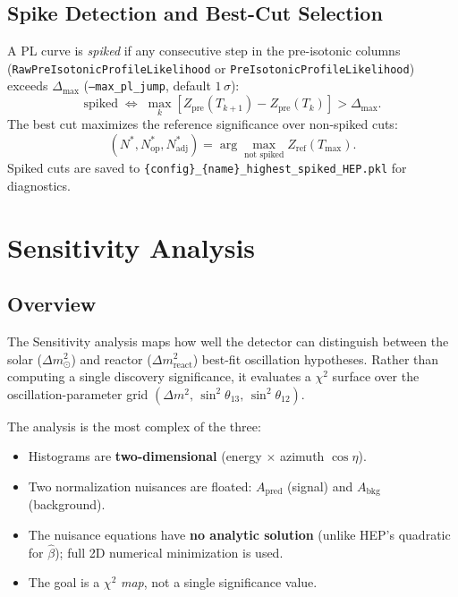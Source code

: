 \documentclass[12pt,a4paper]{article}
\newcommand{\bhat}{\hat{\beta}}
\newcommand{\Apred}{A_{\mathrm{pred}}}
\newcommand{\Abkg}{A_{\mathrm{bkg}}}
\begin{document}
\subsection{Spike Detection and Best-Cut Selection}
\label{sec:spike}

A PL curve is \emph{spiked} if any consecutive step in the pre-isotonic columns
(\texttt{RawPreIsotonicProfileLikelihood} or \texttt{PreIsotonicProfileLikelihood})
exceeds $\Delta_{\max}$ (\texttt{--max\_pl\_jump}, default $1\,\sigma$):
\begin{equation}
  \text{spiked} \;\Leftrightarrow\;
  \max_k\!\left[Z_{\mathrm{pre}}(T_{k+1})-Z_{\mathrm{pre}}(T_k)\right]>\Delta_{\max}.
  \label{eq:spike_criterion}
\end{equation}
The best cut maximizes the reference significance over non-spiked cuts:
\begin{equation}
  (N^*,N_{\mathrm{op}}^*,N_{\mathrm{adj}}^*) =
  \arg\max_{\text{not spiked}} Z_{\mathrm{ref}}(T_{\max}).
  \label{eq:best_cut}
\end{equation}
Spiked cuts are saved to \texttt{\{config\}\_\{name\}\_highest\_spiked\_HEP.pkl}
for diagnostics.

\section{Sensitivity Analysis}
\label{sec:sensitivity}

\subsection{Overview}
\label{sec:sens_overview}

The Sensitivity analysis maps how well the detector can distinguish between
the solar ($\Delta m^2_\odot$) and reactor ($\Delta m^2_{\mathrm{react}}$)
best-fit oscillation hypotheses.  Rather than computing a single discovery
significance, it evaluates a $\chi^2$ surface over the oscillation-parameter grid
$(\Delta m^2,\,\sin^2\theta_{13},\,\sin^2\theta_{12})$.

The analysis is the most complex of the three:
\begin{itemize}[leftmargin=*]
  \item Histograms are \textbf{two-dimensional} (energy $\times$ azimuth $\cos\eta$).
  \item Two normalization nuisances are floated: $\Apred$ (signal) and $\Abkg$ (background).
  \item The nuisance equations have \textbf{no analytic solution}
    (unlike HEP's quadratic for $\bhat$); full 2D numerical minimization is used.
  \item The goal is a $\chi^2$ \emph{map}, not a single significance value.
\end{itemize}
\end{document}
